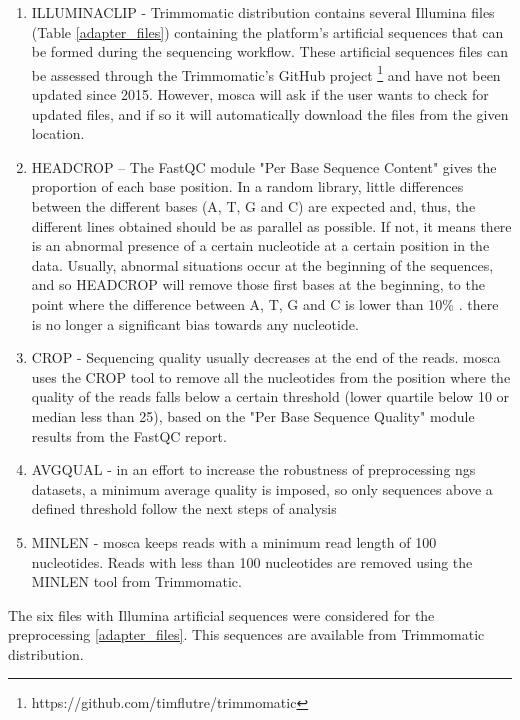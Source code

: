 \documentclass[
  oneside,
  11pt, a4paper,
  footinclude=true,
  headinclude=true,
  cleardoublepage=empty
]{scrbook}
\begin{document}
    \begin{enumerate}
        \item ILLUMINACLIP - Trimmomatic distribution contains several Illumina files (Table \ref{adapter_files}) containing the platform's artificial sequences that can be formed during the sequencing workflow. These artificial sequences files can be assessed through the Trimmomatic’s GitHub project \footnote{https://github.com/timflutre/trimmomatic} and have not been updated since 2015. However, \gls{mosca} will ask if the user wants to check for updated files, and if so it will automatically download the files from the given location.
        \item HEADCROP – The FastQC module "Per Base Sequence Content" gives the proportion of each base position. In a random library, little differences between the different bases (A, T, G and C) are expected and, thus, the different lines obtained should be as parallel as possible. If not, it means there is an abnormal presence of a certain nucleotide at a certain position in the data. Usually, abnormal situations occur at the beginning of the sequences, and so HEADCROP will remove those first bases at the beginning, to the point where the difference between A, T, G and C is lower than 10\% . there is no longer a significant bias towards any nucleotide.
        \item CROP - Sequencing quality usually decreases at the end of the reads. \gls{mosca} uses the CROP tool to remove all the nucleotides from the position where the quality of the reads falls below a certain threshold (lower quartile below 10 or median less than 25), based on the "Per Base Sequence Quality" module results from the FastQC report. 
        \item AVGQUAL - in an effort to increase the robustness of preprocessing \gls{ngs} datasets, a minimum average quality is imposed, so only sequences above a defined threshold follow the next steps of analysis
        \item MINLEN - \gls{mosca} keeps reads with a minimum read length of 100 nucleotides. Reads with less than 100 nucleotides are removed using the MINLEN tool from Trimmomatic.
    \end{enumerate}
    
    The six files with Illumina artificial sequences were considered for the preprocessing \ref{adapter_files}. This sequences are available from Trimmomatic distribution.
    
\end{document}

